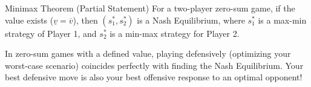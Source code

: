 \documentclass[12pt, a4paper]{article}
\begin{document}
\begin{thmbox}{Minimax Theorem (Partial Statement)}
  For a two-player zero-sum game, if the value exists ($\underline{v} = \overline{v}$), then $(s_1^*, s_2^*)$ is a Nash Equilibrium, where $s_1^*$ is a max-min strategy of Player 1, and $s_2^*$ is a min-max strategy for Player 2.
\end{thmbox}

\begin{takebox}
  In zero-sum games with a defined value, playing defensively (optimizing your worst-case scenario) coincides perfectly with finding the Nash Equilibrium. Your best defensive move is also your best offensive response to an optimal opponent!
\end{takebox}
\end{document}
